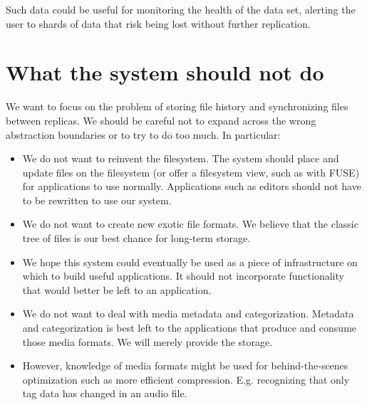 Such data could be useful for monitoring the health of the data set, alerting
the user to shards of data that risk being lost without further replication.


%


\section{What the system should not do}

We want to focus on the problem of storing file history and synchronizing files
between replicas.
We should be careful not to expand across the wrong abstraction boundaries or to
try to do too much.
In particular:

\begin{itemize}

  \item We do not want to reinvent the filesystem. The system should place and
    update files on the filesystem (or offer a filesystem view, such as with
    FUSE) for applications to use normally. Applications such as editors should
    not have to be rewritten to use our system.

  \item We do not want to create new exotic file formats. We believe that the
    classic tree of files is our best chance for long-term storage.

  \item We hope this system could eventually be used as a piece of
    infrastructure on which to build useful applications. It should not
    incorporate functionality that would better be left to an application.

  \item We do not want to deal with media metadata and categorization. Metadata
    and categorization is best left to the applications that produce and consume
    those media formats. We will merely provide the storage.

  \item However, knowledge of media formats might be used for behind-the-scenes
    optimization such as more efficient compression. E.g. recognizing that only
    tag data has changed in an audio file.

\end{itemize}
